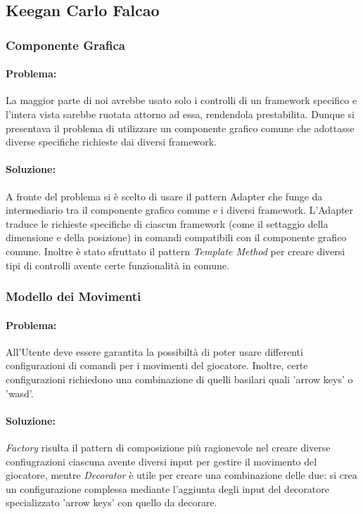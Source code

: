 \documentclass[a4paper,12pt]{report}
\begin{document}
	\subsection{Keegan Carlo Falcao}
	
	\subsubsection{Componente Grafica}
	
	\paragraph{Problema:} La maggior parte di noi avrebbe usato solo i controlli di un framework specifico e l'intera vista sarebbe ruotata attorno ad essa, rendendola prestabilita. Dunque si presentava il problema di utilizzare un componente grafico comune che adottasse diverse specifiche richieste dai diversi framework.
	
	\paragraph{Soluzione:}A fronte del problema si è scelto di usare il pattern {Adapter} che funge da intermediario tra il componente grafico comune e i diversi framework. L'Adapter traduce le richieste specifiche di ciascun framework (come il settaggio della dimensione e della posizione) in comandi compatibili con il componente grafico comune. Inoltre è stato sfruttato il pattern \textit{Template Method} per creare diversi tipi di controlli avente certe funzionalità in comune.
	
	\subsubsection{Modello dei Movimenti}
	
	\paragraph{Problema:} All'Utente deve essere garantita la possibiltà di poter usare differenti configurazioni di comandi per i movimenti del giocatore. Inoltre, certe configurazioni richiedono una combinazione di quelli basilari quali 'arrow keys' o 'wasd'.
	
	\paragraph{Soluzione:} \textit{Factory} risulta il pattern di composizione più ragionevole nel creare diverse confiugrazioni ciascuna avente diversi input per gestire il movimento del giocatore, mentre \textit{Decorator} è utile per creare una combinazione delle due: si crea un configurazione complessa mediante l'aggiunta degli input del decoratore specializzato 'arrow keys' con quello da decorare.
	
\end{document}
